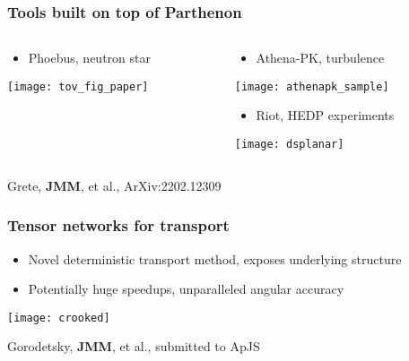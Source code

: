 \documentclass[]{beamer}
\begin{document}
\begin{frame}
  \frametitle{Tools built on top of Parthenon}
  \begin{columns}
    \begin{column}{6cm}
      \begin{itemize}
      \item Phoebus, neutron star
      \end{itemize}
      \begin{center}
        \texttt{[image: tov\_fig\_paper]}
      \end{center}
    \end{column}
    \begin{column}{6cm}
      \begin{itemize}
      \item Athena-PK, turbulence
      \end{itemize}
      \begin{center}
        \texttt{[image: athenapk\_sample]}
      \end{center}
        \begin{itemize}
        \item Riot, HEDP experiments
        \end{itemize}
        \begin{center}
          \texttt{[image: dsplanar]}
        \end{center}
    \end{column}
  \end{columns}
  {\footnotesize Grete, \textbf{JMM}, et al., ArXiv:2202.12309}
\end{frame}

\begin{frame}
  \frametitle{Tensor networks for transport}
  \begin{itemize}
  \item Novel deterministic transport method, exposes underlying structure
  \item Potentially huge speedups, unparalleled angular accuracy
  \end{itemize}
  \begin{center}
    \texttt{[image: crooked]}
  \end{center}
  {\footnotesize Gorodetsky, \textbf{JMM}, et al., submitted to ApJS}
\end{frame}
\end{document}
